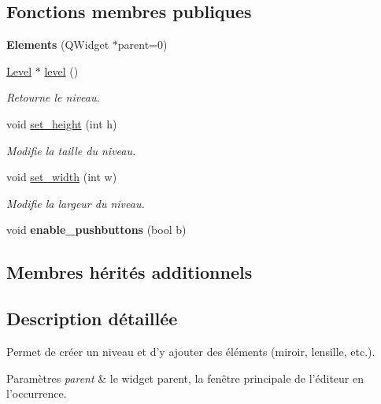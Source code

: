 \subsection*{Fonctions membres publiques}
\begin{DoxyCompactItemize}
\item 
\hypertarget{classElements_a2b73500c747cc879fe708d35aba45532}{{\bfseries Elements} (Q\+Widget $\ast$parent=0)}\label{classElements_a2b73500c747cc879fe708d35aba45532}

\item 
\hyperlink{classLevel}{Level} $\ast$ \hyperlink{classElements_add91eac75df596342176acac4eb8b1a1}{level} ()
\begin{DoxyCompactList}\small\item\em Retourne le niveau. \end{DoxyCompactList}\item 
void \hyperlink{classElements_a077b89b923b450bda172001121825e03}{set\+\_\+height} (int h)
\begin{DoxyCompactList}\small\item\em Modifie la taille du niveau. \end{DoxyCompactList}\item 
void \hyperlink{classElements_af6c7af0c40d3840296224453352fc534}{set\+\_\+width} (int w)
\begin{DoxyCompactList}\small\item\em Modifie la largeur du niveau. \end{DoxyCompactList}\item 
\hypertarget{classElements_ac8411c290c41dcb1777cb649155d3c04}{void {\bfseries enable\+\_\+pushbuttons} (bool b)}\label{classElements_ac8411c290c41dcb1777cb649155d3c04}

\end{DoxyCompactItemize}
\subsection*{Membres hérités additionnels}


\subsection{Description détaillée}
Permet de créer un niveau et d’y ajouter des éléments (miroir, lensille, etc.). 


\begin{DoxyParams}{Paramètres}
{\em parent} & le widget parent, la fenêtre principale de l’éditeur en l’occurrence. \\
\hline
\end{DoxyParams}


